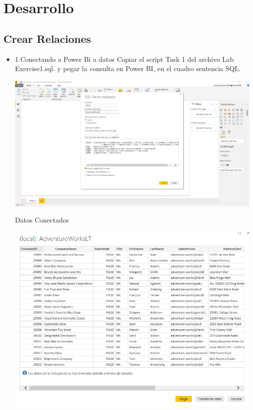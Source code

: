 \section{Desarrollo } 

\subsection {Crear Relaciones}
\begin{itemize}
 \item 1.Conectando a Power Bi a datos
 Copiar el script Task 1 del archivo Lab Exercise1.sql. y pegar la consulta en Power BI, en el cuadro sentencia SQL.
	\begin{center}
	\includegraphics[width=18cm]{./Imagenes/I1}
	\end{center}	
Datos Conectados
\begin{center}
	\includegraphics[width=18cm]{./Imagenes/I2}
	\end{center}	


\end{itemize}
